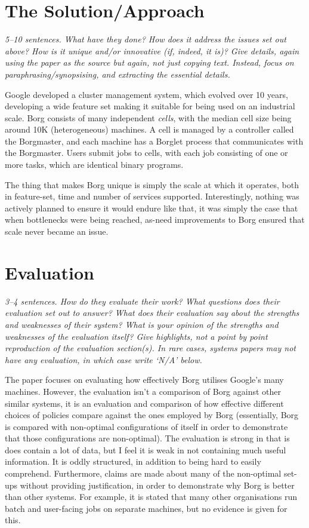 \documentclass[11pt]{article}
\begin{document}
\section*{The Solution/Approach}

\textsl{5--10 sentences. What have they done? How does it address the issues
set out above? How is it unique and/or innovative (if, indeed, it is)? Give
details, again using the paper as the source but again, not just copying text.
Instead, focus on paraphrasing/synopsising, and extracting the essential
details.}

Google developed a cluster management system, which evolved over 10 years,
developing a wide feature set making it suitable for being used on an
industrial scale. Borg consists of many independent \textit{cells}, with the
median cell size being around 10K (heterogeneous) machines. A cell is managed
by a controller called the Borgmaster, and each machine has a Borglet process
that communicates with the Borgmaster. Users submit jobs to cells, with each
job consisting of one or more tasks, which are identical binary programs.

The thing that makes Borg unique is simply the scale at which it operates,
both in feature-set, time and number of services supported. Interestingly,
nothing was actively planned to ensure it would endure like that, it was simply
the case that when bottlenecks were being reached, as-need improvements to Borg
ensured that scale never became an issue.

\section*{Evaluation}

\textsl{3--4 sentences. How do they evaluate their work? What questions does
their evaluation set out to answer? What does their evaluation say about the
strengths and weaknesses of their system? What is your opinion of the strengths
and weaknesses of the evaluation itself? Give highlights, not a point by point
reproduction of the evaluation section(s). In rare cases, systems papers may
not have any evaluation, in which case write `N/A' below.}

The paper focuses on evaluating how effectively Borg utilises Google's many
machines. However, the evaluation isn't a comparison of Borg against other
similar systems, it is an evaluation and comparison of how effective different
choices of policies compare against the ones employed by Borg (essentially,
Borg is compared with non-optimal configurations of itself in order to
demonstrate that those configurations are non-optimal). The evaluation is
strong in that is does contain a lot of data, but I feel it is weak in not
containing much useful information. It is oddly structured, in addition to
being hard to easily comprehend. Furthermore, claims are made about many of the
non-optimal set-ups without providing justification, in order to demonstrate
why Borg is better than other systems. For example, it is stated that many
other organisations run batch and user-facing jobs on separate machines, but no
evidence is given for this.
\end{document}

